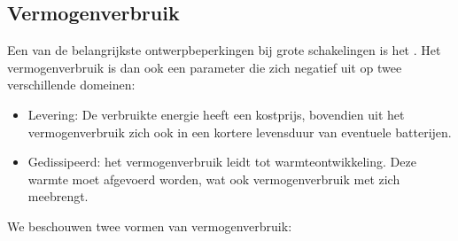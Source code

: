 \subsection{Vermogenverbruik}
Een van de belangrijkste ontwerpbeperkingen bij grote schakelingen is het . Het vermogenverbruik is dan ook een parameter die zich negatief uit op twee verschillende domeinen:
\begin{itemize}
 \item Levering: De verbruikte energie heeft een kostprijs, bovendien uit het vermogenverbruik zich ook in een kortere levensduur van eventuele batterijen.
 \item Gedissipeerd: het vermogenverbruik leidt tot warmteontwikkeling. Deze warmte moet afgevoerd worden, wat ook vermogenverbruik met zich meebrengt.
\end{itemize}
We beschouwen twee vormen van vermogenverbruik:
